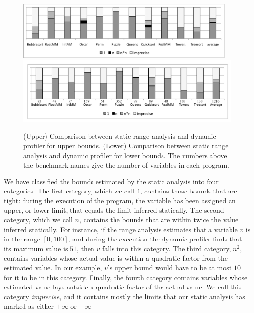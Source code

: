 \documentclass[preprint]{elsarticle}
\begin{document}
\begin{figure}[t!]
\begin{center}
\includegraphics[width=0.97\textwidth]{images/precUpperBound}
\includegraphics[width=\textwidth]{images/precLowerBound}
\end{center}
\caption{\label{fig:precision}
(Upper) Comparison between static range analysis and dynamic profiler for
upper bounds.
(Lower) Comparison between static range analysis and dynamic profiler for
lower bounds. The numbers above the benchmark names give the number of
variables in each program.}
\end{figure}

We have classified the bounds estimated by the static analysis into four
categories.
The first category, which we call $1$, contains those bounds that are tight:
during the execution of the program, the variable has been assigned an upper,
or lower limit, that equals the limit inferred statically.
The second category, which we call $n$, contains the bounds that are
within twice the value inferred statically.
For instance, if the range analysis estimates that a variable $v$ is in the
range $[0, 100]$, and during the execution the dynamic profiler finds that
its maximum value is $51$, then $v$ falls into this category.
The third category, $n^2$, contains variables whose actual value is within
a quadratic factor from the estimated value.
In our example, $v$'s upper bound would have to be at most $10$ for it to
be in this category.
Finally, the fourth category contains variables whose estimated value lays
outside a quadratic factor of the actual value.
We call this category {\em imprecise}, and it contains mostly the limits that
our static analysis has marked as either $+\infty$ or $-\infty$.
\end{document}
